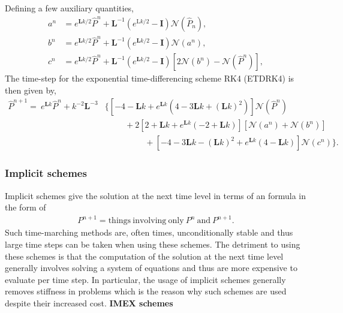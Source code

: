 \documentclass[10pt]{article}
\newcommand{\Phat}{\hat{P}}
\newcommand{\mN}{\bm{\mathcal{N}}}
\begin{document}
Defining a few auxiliary quantities,
\begin{subequations}
    \begin{align}
    a^{n} &= e^{\mathbf{L} k / 2} \Phat^{n}+\mathbf{L}^{-1}\left(e^{\mathrm{L} k / 2}-\mathbf{I}\right) \mN\left(\Phat_{n}\right), \\ 
    b^{n} &= e^{\mathbf{L} k / 2} \Phat^{n}+\mathbf{L}^{-1}\left(e^{\mathbf{L} k / 2}-\mathbf{I}\right) \mN\left(a^{n}\right), \\ 
    c^{n} &= e^{\mathbf{L} k / 2} \Phat^{n}+\mathbf{L}^{-1}\left(e^{\mathbf{L} k / 2}-\mathbf{I}\right)\left[2 \mN\left(b^{n}\right)-\mN\left(\Phat^{n}\right)\right],
    \end{align}
\end{subequations}
The time-step for the exponential time-differencing scheme RK4 (ETDRK4) is then given by,
\begin{align}
    \Phat^{n+1}=\ e^{\mathbf{L} k} \Phat^{n}+k^{-2} \mathbf{L}^{-3}&\Bigg\{\left[-4-\mathbf{L} k+e^{\mathbf{L} k}\left(4-3 \mathbf{L} k+(\mathbf{L} k)^{2}\right)\right] \mN\left(\Phat^{n}\right) \nonumber\\ 
    &\hspace{1cm}+2\left[2+\mathbf{L} k+e^{\mathbf{L} k}(-2+\mathbf{L} k)\right]\left[\mN\left(a^{n}\right)+\mN\left(b^{n}\right)\right] \nonumber\\
    &\hspace{2cm}+\left[-4-3 \mathbf{L} k-(\mathbf{L} k)^{2}+e^{\mathbf{L}k}(4-\mathbf{L} k)\right] \mN\left(c^{n}\right)\Bigg\}. \label{eq:etd_scheme}
\end{align}

\subsubsection{Implicit schemes}

Implicit schemes give the solution at the next time level in terms of an  formula in the form of
\begin{align*}
    P^{n+1} = \mathrm{things\ involving\ only\ }P^{n}\ \mathrm{and}\ P^{n+1}.
\end{align*}
Such time-marching methods are, often times, unconditionally stable and thus large time steps can be taken when using these schemes. The detriment to using these schemes is that the computation of the solution at the next time level generally involves solving a system of equations and thus are more expensive to evaluate per time step. In particular, the usage of implicit schemes generally removes stiffness in problems which is the reason why such schemes are used despite their increased cost.
\newline\newline
\textbf{IMEX schemes}
\end{document}
